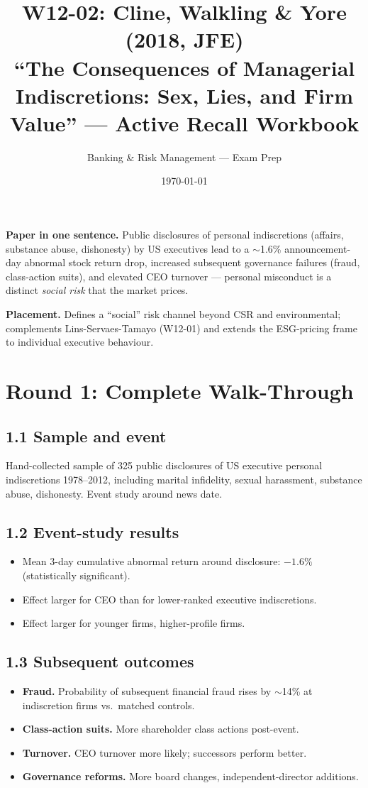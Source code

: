 \documentclass[11pt]{article}
\title{W12-02: Cline, Walkling \& Yore (2018, JFE) \\
\large ``The Consequences of Managerial Indiscretions: Sex, Lies, and Firm Value'' --- Active Recall Workbook}
\author{Banking \& Risk Management --- Exam Prep}
\date{\today}
\begin{document}
\maketitle

\begin{keybox}
\textbf{Paper in one sentence.} Public disclosures of personal indiscretions (affairs, substance abuse, dishonesty) by US executives lead to a $\sim$1.6\% announcement-day abnormal stock return drop, increased subsequent governance failures (fraud, class-action suits), and elevated CEO turnover --- personal misconduct is a distinct \emph{social risk} that the market prices.

\textbf{Placement.} Defines a ``social'' risk channel beyond CSR and environmental; complements Lins-Servaes-Tamayo (W12-01) and extends the ESG-pricing frame to individual executive behaviour.
\end{keybox}

\section*{Round 1: Complete Walk-Through}

\subsection*{1.1 Sample and event}
Hand-collected sample of 325 public disclosures of US executive personal indiscretions 1978--2012, including marital infidelity, sexual harassment, substance abuse, dishonesty. Event study around news date.

\subsection*{1.2 Event-study results}
\begin{itemize}
\item Mean 3-day cumulative abnormal return around disclosure: $-1.6\%$ (statistically significant).
\item Effect larger for CEO than for lower-ranked executive indiscretions.
\item Effect larger for younger firms, higher-profile firms.
\end{itemize}

\subsection*{1.3 Subsequent outcomes}
\begin{itemize}
\item \textbf{Fraud.} Probability of subsequent financial fraud rises by $\sim$14\% at indiscretion firms vs.\ matched controls.
\item \textbf{Class-action suits.} More shareholder class actions post-event.
\item \textbf{Turnover.} CEO turnover more likely; successors perform better.
\item \textbf{Governance reforms.} More board changes, independent-director additions.
\end{itemize}
\end{document}
